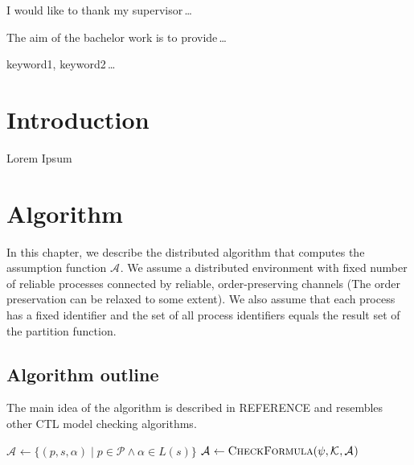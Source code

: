 \documentclass[12pt,oneside,draft]{fithesis2}
\newcommand{\as}[1][]{\ensuremath{\mathcal{A}_{#1}}}
\newcommand{\ks}[1][]{\ensuremath{\mathcal{K}_{#1}}}
\newcommand{\fullks}{\ensuremath{ \ks = (id, f, \params, S, I, \trans{p}, L) }}
\newcommand{\trans}[1]{\stackrel{#1}{\rightarrow}}
\newcommand{\params}{\mathcal{P}}
\begin{document}
  \FrontMatter                    %
    \ThesisTitlePage                %
    \begin{ThesisDeclaration}       %
      \DeclarationText
      \AdvisorName
    \end{ThesisDeclaration}
    \begin{ThesisThanks}            %
      I would like to thank my supervisor\,\dots
    \end{ThesisThanks}
    \begin{ThesisAbstract}          %
      The aim of the bachelor work is to provide\,\dots
    \end{ThesisAbstract}
    \begin{ThesisKeyWords}          %
      keyword1, keyword2\,\dots
    \end{ThesisKeyWords}
    \tableofcontents                %
  
  \MainMatter                     %
    \chapter{Introduction}          %
	Lorem Ipsum \cite{testCite}
    \chapter{Algorithm}
    
    	In this chapter, we describe the distributed algorithm that computes the assumption function $\as$. We assume a distributed environment with fixed number of reliable processes connected by reliable, order-preserving channels (The order preservation can be relaxed to some extent). We also assume that each process has a fixed identifier and the set of all process identifiers equals the result set of the partition function.
    	
		\section{Algorithm outline}
		
			The main idea of the algorithm is described in REFERENCE and resembles other CTL model checking algorithms.
			
			\begin{algorithmic}[1]
				\Procedure{CheckCTL}{$ \phi, \fullks $}
					\State $ \as \gets \{ (p, s, \alpha) \mid  p \in \params \wedge \alpha \in L(s) \}$ 
						\State $ \as \gets \Call{CheckFormula}{\psi, \ks, \as } $
					\EndFor
					\EndFor
				\EndProcedure			
			\end{algorithmic} 
			
\end{document}
